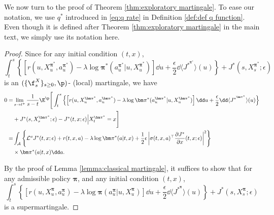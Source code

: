We now turn to the proof of Theorem \ref{thm:exploratory martingale}. To ease our notation, we use $q^*$ introduced in \eqref{eq:q rate} in Definition \ref{def:def q function}. Even though it is defined after Theorem \ref{thm:exploratory martingale} in the main text, we simply use its notation here. 
\begin{proof}
Since for any initial condition $(t,x)$,
\[ \int_t^s \left\{ \left[ r(u, X_{u}^{\bm \pi^*}, a_{u}^{\bm \pi^*}) - \lambda\log\bm\pi^*(a_{u}^{\bm\pi^*}|u, X_{u}^{\bm\pi^*}) \right] \dd u + \frac{\epsilon}{2} \dd \langle  J^{*^{\bm \pi^*}} \rangle(u)\right\}+ J^*(s, X_s^{\bm \pi^*};\epsilon) \]
is an $(\{\f_s^X \}_{s\geq 0},\p)$- (local) martingale, we have 
\begin{equation}
\label{eq:hjb exploratory}
\begin{aligned}
0 = & \lim_{s\to t^+} \frac{1}{s-t}\E^{\p}\Bigg[ \int_t^s \left\{ \left[ r(u, X_{u}^{\bm \pi^*}, a_{u}^{\bm \pi^*}) - \lambda\log\bm\pi^*(a_{u}^{\bm\pi^*}|u, X_{u}^{\bm\pi^*}) \right] \dd u + \frac{\epsilon}{2} \dd \langle  J^{*^{\bm \pi^*}} \rangle(u)\right\} \\
& + J^*(s, X_s^{\bm \pi^*};\epsilon) - J^*(t,x;\epsilon) \Big| X_t^{\bm\pi^*} = x\Bigg] \\
= & \int_{{\cal A}} \left\{ \mathcal{L}^{a} J^*(t,x;\epsilon) + r(t,x,a) - \lambda \log\bm\pi^*(a|t,x) + \frac{1}{2}\epsilon \left| \sigma(t,x,a)^\top \frac{\partial J^*}{\partial x}(t,x;\epsilon)\right|^2 \right\} \\
& \times \bm\pi^*(a|t,x)\dd a .
\end{aligned}
\end{equation}	

By the proof of Lemma \ref{lemma:classical martingale}, it suffices to show that for any admissible policy $\bm\pi$, and any initial condition $(t,x)$,
\[ \int_t^s \left\{ \left[ r(u, X_{u}^{\bm \pi}, a_{u}^{\bm \pi}) - \lambda\log\bm\pi(a_{u}^{\bm\pi}|u, X_{u}^{\bm\pi}) \right] \dd u + \frac{\epsilon}{2} \dd \langle  J^{*^{\bm \pi}} \rangle(u)\right\}+ J^*(s, X_s^{\bm \pi};\epsilon) \]
is a supermartingale.


\end{proof}
